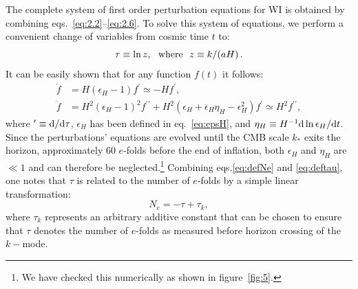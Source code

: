 \documentclass[a4paper,11pt]{article}
\begin{document}
The complete system of first order perturbation equations for WI is obtained by combining eqs.~\eqref{eq:2.2}--\eqref{eq:2.6}. To solve this system of equations, we perform a convenient change of variables from cosmic time $t$ to: 
\begin{equation}
    \tau\equiv\ln z, \,\,\,\, {\rm{ where}} \,\,\,\, z\equiv k/(aH) \, . \label{eq:deftau}
    \end{equation}
    It can be easily shown that for any function $f(t)$ it follows:
\begin{align}
    \dot{f}  &= H(\epsilon_H-1)f^{\prime}\simeq -H f^{\prime} , \label{eq:chain_rule1}\\
    \ddot{f} &= H^2(\epsilon_H-1)^2 f^{\prime\prime}+H^2(\epsilon_H+\epsilon_H\eta_H-\epsilon_H^2)f^{\prime}\simeq H^2 f^{\prime\prime}, \label{eq:chain_rule2}
\end{align}
where $^\prime \equiv {\rm d}/{\rm d}\tau$, $\epsilon_H$ has been defined in eq.~\eqref{eq:epsH}, and $\eta_H\equiv H^{-1}{\rm d}\ln\epsilon_H/{\rm d}t$. Since the perturbations' equations are evolved until the CMB scale $k_{*}$ exits the horizon, approximately 60 $e$-folds before the end of inflation, both $\epsilon_H$ and $\eta_H$ are $\ll 1$  and can therefore be neglected.\footnote{We have checked this numerically as shown in figure~\ref{fig:5}.} Combining eqs.\ref{eq:defNe} and \ref{eq:deftau}, one notes that $\tau$  is related to the
number of $e$-folds by a simple linear transformation:
\begin{equation}
    N_e=-\tau+ \tau_k, \label{eq:Netotau}
\end{equation}
where $\tau_k$ represents an arbitrary additive constant that can be chosen to ensure that $\tau$ denotes the number of $e$-folds as measured before horizon crossing of the $k-$mode. 
\end{document}
